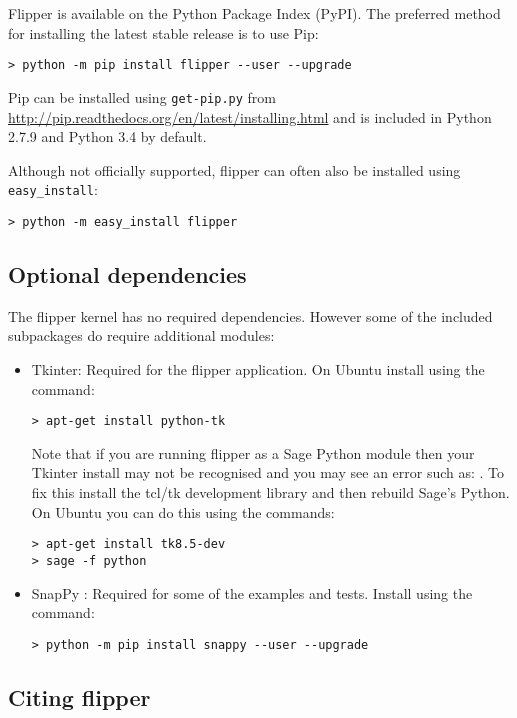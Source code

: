 \documentclass[a4paper]{article}
\newcommand{\exc}[1]{\mbox{\PVerb{#1}}}
\begin{document}
Flipper is available on the Python Package Index (PyPI). The preferred method for installing the latest stable release is to use Pip:
\begin{lstlisting}
> python -m pip install flipper --user --upgrade
\end{lstlisting}
Pip can be installed using \texttt{get-pip.py} from \url{http://pip.readthedocs.org/en/latest/installing.html} and is included in Python 2.7.9 and Python 3.4 by default.

Although not officially supported, flipper can often also be installed using \texttt{easy\_install}:
\begin{lstlisting}
> python -m easy_install flipper
\end{lstlisting}

\subsection{Optional dependencies}

The flipper kernel has no required dependencies. However some of the included subpackages do require additional modules:

\begin{itemize}
\item Tkinter: Required for the flipper application. On Ubuntu install using the command:
\begin{lstlisting}
> apt-get install python-tk
\end{lstlisting}
Note that if you are running flipper as a Sage Python module then your Tkinter install may not be recognised and you may see an error such as: \exc{Error: no module named _tkinter}. To fix this install the tcl/tk development library and then rebuild Sage's Python. On Ubuntu you can do this using the commands:
\begin{lstlisting}
> apt-get install tk8.5-dev
> sage -f python
\end{lstlisting}
\item SnapPy \cite{SnapPy}: Required for some of the examples and tests. Install using the command:
\begin{lstlisting}
> python -m pip install snappy --user --upgrade
\end{lstlisting}
\end{itemize}

\subsection{Citing flipper}
\end{document}
